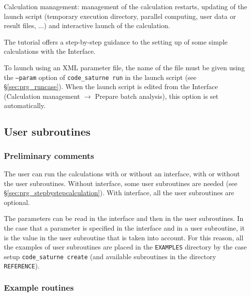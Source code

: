 {{{{\begin{list}{-}{}
\item Calculation management: management of the calculation restarts,
      updating of the launch script (temporary execution directory, parallel
      computing, user data or result files, ...) and interactive launch of the
      calculation.

\end{list}

The \CS tutorial \cite{tutorial} offers a step-by-step guidance to the setting
up of some simple calculations with the \CS Interface.

To launch \CS using an XML parameter file,
the name of the file must
be given using the \texttt{--param} option of \texttt{code\_saturne run} in
the launch script (see \S\ref{sec:prg_runcase}). When the launch
script is edited from the Interface (Calculation management $\rightarrow$
Prepare batch analysis), this option is set automatically.

\subsection{User subroutines}
\label{sec:prg_ssprgutilis}
\subsubsection{Preliminary comments}

The user can run the calculations with or without an interface, with or
 without the user subroutines. Without interface, some user subroutines
 are needed (see \S\ref{sec:prg_stepbystepcalculation}). With interface,
all the user subroutines are optional.

The parameters can be read in the interface and then in the user
subroutines. In the case that a parameter is specified in the interface
 and in a user subroutine, it is the value in the user subroutine that
 is taken into account. For this reason, all the examples of
 user subroutines are placed in the \texttt{EXAMPLES} directory by the
 case setup \texttt{code\_saturne~create} (and available subroutines in the
 directory \texttt{REFERENCE}).

\subsubsection{Example routines}

}}}}
